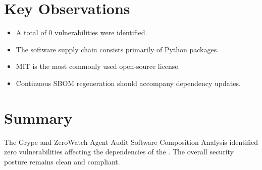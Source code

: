 
\section{Key Observations}

\begin{itemize}
\item A total of 0 vulnerabilities were identified.
\item The software supply chain consists primarily of Python packages.
\item MIT is the most commonly used open-source license.
\item Continuous SBOM regeneration should accompany dependency updates.
\end{itemize}

\vspace{0.4cm}


\section{Summary}

The Grype and ZeroWatch Agent Audit Software Composition Analysis identified zero vulnerabilities affecting the dependencies of the \textbf{\ProjectName}. The overall security posture remains clean and compliant.